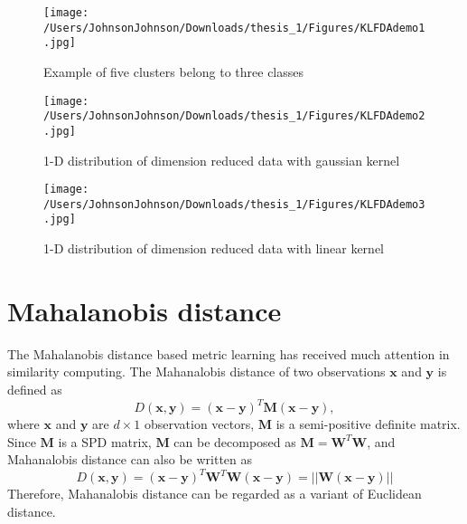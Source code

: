 \begin{figure}[H]
\centering
\texttt{[image: /Users/JohnsonJohnson/Downloads/thesis\_1/Figures/KLFDAdemo1.jpg]}
\caption{Example of five clusters belong to three classes}
\label{KLFDAdemo1}
\vspace{0em}
\end{figure} 


\begin{figure}[H]
\centering
\texttt{[image: /Users/JohnsonJohnson/Downloads/thesis\_1/Figures/KLFDAdemo2.jpg]}
\caption{1-D distribution of dimension reduced data  with gaussian kernel}
\label{KLFDAdemo2}
\vspace{-1em}
\end{figure} 


\begin{figure}[H]
\centering
\texttt{[image: /Users/JohnsonJohnson/Downloads/thesis\_1/Figures/KLFDAdemo3.jpg]}
\caption{1-D distribution of dimension reduced data  with linear kernel}
\label{KLFDAdemo3}
\vspace{-1em}
\end{figure} 


\section{Mahalanobis distance}
The Mahalanobis distance \cite{Mahadist} based metric learning has received much attention in similarity computing. The Mahanalobis distance of two observations $\bm{x} $ and $\bm{y}$ is defined as
\begin{equation}
\label{MahaDist}
D(\bm{x},\bm{y}) = (\bm{x} - \bm{y})^T\bm{M}(\bm{x} - \bm{y}), 
\end{equation}
where $\bm{x}$ and $\bm{y} $ are $d\times1$ observation vectors, $\bm{M}$ is a semi-positive definite matrix. Since $\bm{M}$ is a SPD matrix, $\bm{M}$ can be decomposed as $\bm{M} = \bm{W}^T\bm{W}$, and Mahanalobis distance can also be written as 
\begin{equation}
D(\bm{x},\bm{y}) = (\bm{x} - \bm{y})^T\bm{W}^T\bm{W}(\bm{x} - \bm{y})= ||\bm{W}(\bm{x} - \bm{y})||
\end{equation}
 Therefore, Mahanalobis distance can be regarded as a variant of Euclidean distance.
 
